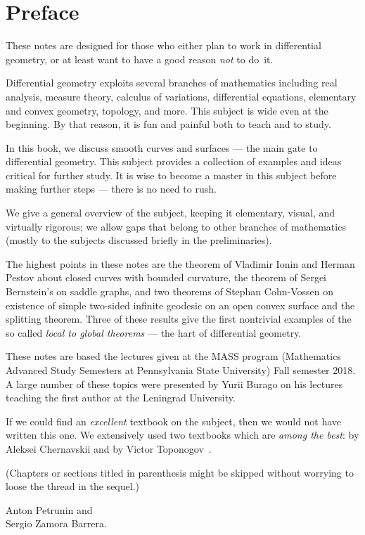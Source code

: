 
\chapter*{Preface}

These notes are designed for those who either plan to work in differential geometry,
or at least want to have a good reason \emph{not} to do~it.

Differential geometry exploits several branches of mathematics including 
real analysis, 
measure theory,
calculus of variations,
differential equations,
elementary and convex geometry,
topology, and more.
This subject is wide even at the beginning. 
By that reason, it is fun and painful both to teach and to study.

In this book, we discuss smooth curves and surfaces --- the main gate to differential geometry.
This subject provides a collection of examples and ideas critical for further study.
It is wise to become a master in this subject before making further steps --- there is no need to rush.

We give a general overview of the subject, keeping it elementary, visual, and virtually rigorous; we allow gaps that belong to other branches of mathematics (mostly to the subjects discussed briefly in the preliminaries).

The highest points in these notes are
the theorem of Vladimir Ionin and Herman Pestov about closed curves with bounded curvature,
the theorem of Sergei Bernstein's on saddle graphs,
and two theorems of Stephan Cohn-Vossen on existence of simple two-sided infinite geodesic on an open convex surface and the splitting theorem.
Three of these results give the first nontrivial examples of the so called {}\emph{local to global theorems} --- the hart of differential geometry.

These notes are based the lectures given at the MASS program (Mathematics Advanced Study Semesters at Pennsylvania State University) Fall semester 2018.
A large number of these topics were presented by Yurii Burago on his lectures teaching the first author at the Leningrad University.

If we could find an \emph{excellent} textbook on the subject, then we would not have written this one.
We extensively used two textbooks which are \emph{among the best}: by Aleksei Chernavskii \cite{chernavsky} and by Victor Toponogov~\cite{toponogov-book}.

(Chapters or sections titled in parenthesis might be skipped without worrying to loose the thread in the sequel.)

\begin{flushright}
Anton Petrunin and\\
Sergio Zamora Barrera.
\end{flushright}



\newpage
\tableofcontents
